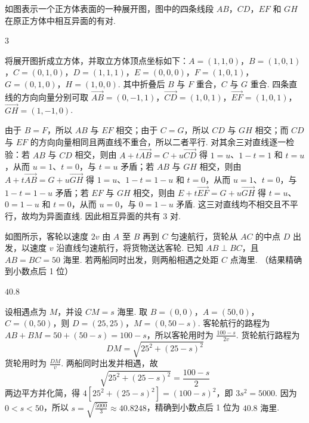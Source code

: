 \begin{problem}
如图表示一个正方体表面的一种展开图，图中的四条线段 \(AB\)，\(CD\)，\(EF\) 和 \(GH\) 在原正方体中相互异面的有\fillinblank{}对.

\end{problem}

\begin{answer}
\(3\)
\end{answer}

\begin{solution}
将展开图折成立方体，并取立方体顶点坐标如下：\(A=(1,1,0)\)，\(B=(1,0,1)\)，\(C=(0,1,0)\)，\(D=(1,1,1)\)，\(E=(0,0,0)\)，\(F=(1,0,1)\)，\(G=(0,1,0)\)，\(H=(1,0,0)\). 其中折叠后 \(B\) 与 \(F\) 重合，\(C\) 与 \(G\) 重合. 四条直线的方向向量分别可取 \(\overrightarrow{AB}=(0,-1,1)\)，\(\overrightarrow{CD}=(1,0,1)\)，\(\overrightarrow{EF}=(1,0,1)\)，\(\overrightarrow{GH}=(1,-1,0)\).

由于 \(B=F\)，所以 \(AB\) 与 \(EF\) 相交；由于 \(C=G\)，所以 \(CD\) 与 \(GH\) 相交；而 \(CD\) 与 \(EF\) 的方向向量相同且两直线不重合，所以二者平行. 对其余三对直线逐一检验：若 \(AB\) 与 \(CD\) 相交，则由 \(A+t\overrightarrow{AB}=C+u\overrightarrow{CD}\) 得 \(1=u\)、\(1-t=1\) 和 \(t=u\)，从而 \(u=1\)、\(t=0\)，与 \(t=u\) 矛盾；若 \(AB\) 与 \(GH\) 相交，则由 \(A+t\overrightarrow{AB}=G+u\overrightarrow{GH}\) 得 \(1=u\)、\(1-t=1-u\) 和 \(t=0\)，从而 \(u=1\)、\(t=0\)，与 \(1-t=1-u\) 矛盾；若 \(EF\) 与 \(GH\) 相交，则由 \(E+t\overrightarrow{EF}=G+u\overrightarrow{GH}\) 得 \(t=u\)、\(0=1-u\) 和 \(t=0\)，从而 \(u=0\)，与 \(0=1-u\) 矛盾. 这三对直线均不相交且不平行，故均为异面直线. 因此相互异面的共有 3 对.
\end{solution}

\begin{problem}
如图所示，客轮以速度 \(2v\) 由 \(A\) 至 \(B\) 再到 \(C\) 匀速航行，货轮从 \(AC\) 的中点 \(D\) 出发，以速度 \(v\) 沿直线匀速航行，将货物送达客轮. 已知 \(AB \perp BC\)，且 \(AB = BC = 50\text{ 海里}\). 若两船同时出发，则两船相遇之处距 \(C\) 点\fillinblank{}\(\text{海里}\). （结果精确到小数点后 1 位）

\end{problem}

\begin{answer}
\(40.8\)
\end{answer}

\begin{solution}
设相遇点为 \(M\)，并设 \(CM=s\text{ 海里}\). 取 \(B=(0,0)\)，\(A=(50,0)\)，\(C=(0,50)\)，则 \(D=(25,25)\)，\(M=(0,50-s)\).
客轮航行的路程为 \(AB+BM=50+(50-s)=100-s\)，所以客轮用时为 \(\frac{100-s}{2v}\). 货轮航行路程为
\[
DM=\sqrt{25^2+(25-s)^2}
\]
货轮用时为 \(\frac{DM}{v}\). 两船同时出发并相遇，故
\[
\sqrt{25^2+(25-s)^2}=\frac{100-s}{2}
\]
两边平方并化简，得 \(4\left[25^2+(25-s)^2\right]=(100-s)^2\)，即 \(3s^2=5000\). 因为 \(0<s<50\)，所以 \(s=\sqrt{\frac{5000}{3}}\approx40.8248\)，精确到小数点后 1 位为 \(40.8\text{ 海里}\).
\end{solution}

